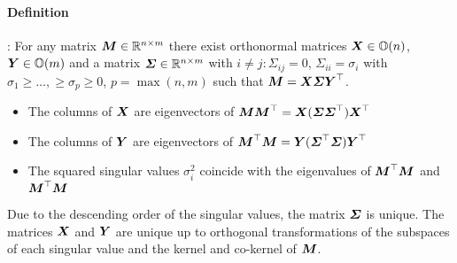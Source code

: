 \paragraph{Definition}
\cite[Theo.\ 2.5.2]{Golub:MatrixComputations}:
For any matrix $\boldsymbol{M} \in \mathbb{R}^{n\times m}$ there exist orthonormal matrices $\boldsymbol{X} \in \mathbb{O}(n)$, $\boldsymbol{Y} \in \mathbb{O}(m)$ and a matrix $\boldsymbol{\varSigma} \in \mathbb{R}^{n\times m}$ with $i\neq j : \varSigma_{ij} = 0$, $\varSigma_{ii} = \sigma_i$ with $\sigma_1 \geq \ldots, \geq \sigma_p \geq 0$, $p=\max(n,m)$ such that $\boldsymbol{M} = \boldsymbol{X} \boldsymbol{\varSigma} \boldsymbol{Y}^\top$.
\begin{itemize}
 \item The columns of $\boldsymbol{X}$ are eigenvectors of $\boldsymbol{M} \boldsymbol{M}^\top = \boldsymbol{X} (\boldsymbol{\varSigma} \boldsymbol{\varSigma}^\top) \boldsymbol{X}^\top$
 \item The columns of $\boldsymbol{Y}$ are eigenvectors of $\boldsymbol{M}^\top \boldsymbol{M} = \boldsymbol{Y} (\boldsymbol{\varSigma}^\top \boldsymbol{\varSigma}) \boldsymbol{Y}^\top$
 \item The squared singular values $\sigma_i^2$ coincide with the eigenvalues of $\boldsymbol{M}^\top \boldsymbol{M}$ and $\boldsymbol{M}^\top \boldsymbol{M}$
\end{itemize}
Due to the descending order of the singular values, the matrix $\boldsymbol{\varSigma}$ is unique.
The matrices $\boldsymbol{X}$ and $\boldsymbol{Y}$ are unique up to orthogonal transformations of the subspaces of each singular value and the kernel and co-kernel of $\boldsymbol{M}$.



